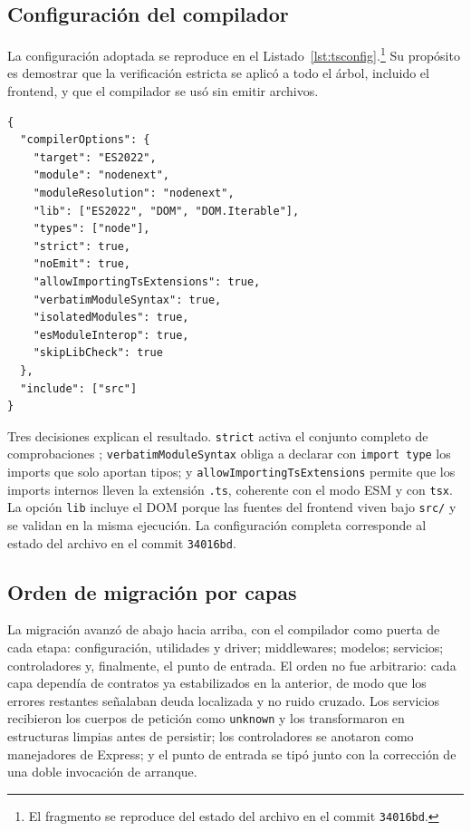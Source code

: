 \documentclass[conference]{IEEEtran}
\begin{document}
\subsection{Configuración del compilador}
La configuración adoptada se reproduce en el Listado~\ref{lst:tsconfig}.\footnote{El
fragmento se reproduce del estado del archivo en el commit \texttt{34016bd}.}
Su propósito es demostrar que la verificación estricta se
aplicó a todo el árbol,
incluido el frontend, y que el compilador se usó sin emitir archivos.

\begin{lstlisting}[caption={Configuración del compilador (\texttt{tsconfig.json})},
label={lst:tsconfig}]
{
  "compilerOptions": {
    "target": "ES2022",
    "module": "nodenext",
    "moduleResolution": "nodenext",
    "lib": ["ES2022", "DOM", "DOM.Iterable"],
    "types": ["node"],
    "strict": true,
    "noEmit": true,
    "allowImportingTsExtensions": true,
    "verbatimModuleSyntax": true,
    "isolatedModules": true,
    "esModuleInterop": true,
    "skipLibCheck": true
  },
  "include": ["src"]
}
\end{lstlisting}

Tres decisiones explican el resultado. \texttt{strict} activa el conjunto
completo de comprobaciones \cite{typescript-handbook,tsconfig-strict};
\texttt{verbatimModuleSyntax} obliga a declarar con \texttt{import type} los
imports que solo aportan tipos; y \texttt{allowImportingTsExtensions} permite
que los imports internos lleven la extensión \texttt{.ts}, coherente con el
modo ESM y con \texttt{tsx}. La opción \texttt{lib} incluye el DOM porque las
fuentes del frontend viven bajo \texttt{src/} y se validan en la misma
ejecución. La configuración completa corresponde al estado del archivo en el
commit \texttt{34016bd}.

\subsection{Orden de migración por capas}
La migración avanzó de abajo hacia arriba, con el compilador como puerta de
cada etapa: configuración, utilidades y driver; middlewares; modelos;
servicios; controladores y, finalmente, el punto de entrada. El orden no fue
arbitrario: cada capa dependía de contratos ya estabilizados en la anterior,
de modo que los errores restantes señalaban deuda localizada y no ruido
cruzado. Los servicios recibieron los cuerpos de petición como
\texttt{unknown} y los transformaron en estructuras limpias antes de persistir;
los controladores se anotaron como manejadores de Express; y el punto de
entrada se tipó junto con la corrección de una doble invocación de arranque.
\end{document}

